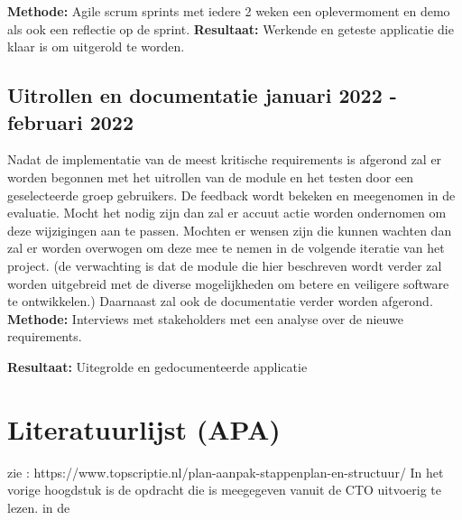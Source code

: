 \textbf{Methode:} Agile scrum sprints met iedere 2 weken een oplevermoment en demo als ook een reflectie op de sprint.
\textbf{Resultaat:} Werkende en geteste applicatie die klaar is om uitgerold te worden.

\subsection{Uitrollen en documentatie \textbf{januari 2022 - februari 2022 }}\label{sec:uitrollen-en-documentatie}
Nadat de implementatie van de meest kritische requirements is afgerond zal er worden begonnen met het uitrollen van de module en het testen door een geselecteerde groep gebruikers. De feedback wordt bekeken en meegenomen in de evaluatie. Mocht het nodig zijn dan zal er accuut actie worden ondernomen om deze wijzigingen aan te passen. Mochten er wensen zijn die kunnen wachten dan zal er worden overwogen om deze mee te nemen in de volgende iteratie van het project. (de verwachting is dat de module die hier beschreven wordt verder zal worden uitgebreid met de diverse mogelijkheden om betere en veiligere software te ontwikkelen.) Daarnaast zal ook de documentatie verder worden afgerond.
\textbf{Methode:} Interviews met stakeholders met een analyse over de nieuwe requirements.

\textbf{Resultaat:} Uitegrolde en gedocumenteerde applicatie


\section{Literatuurlijst (APA)}

zie : https://www.topscriptie.nl/plan-aanpak-stappenplan-en-structuur/
In het vorige hoogdstuk is de opdracht die is meegegeven vanuit de CTO uitvoerig te lezen. in de






